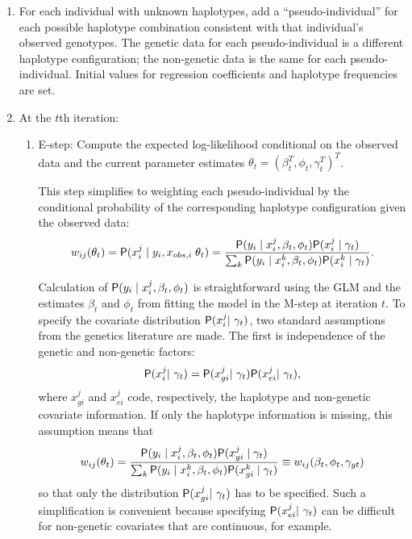 \documentclass[article, shortnames]{jss}
\begin{document}
\begin{enumerate}

\item For each individual with unknown haplotypes, add a ``pseudo-individual'' 
for each possible haplotype combination consistent with that individual's 
observed genotypes. The genetic data for each pseudo-individual is a different 
haplotype configuration; the non-genetic data is the same for each 
pseudo-individual. Initial values for regression coefficients and haplotype 
frequencies are set.

\item At the $t$th iteration:

\begin{enumerate}

\item E-step: Compute the expected log-likelihood conditional on the
observed data and the current parameter estimates
$\theta_t = (\beta_t^T,\phi_t, \gamma_t^T)^T$.

This step simplifies to weighting each pseudo-individual by 
the conditional probability of the corresponding haplotype configuration given 
the observed data:
$$
w_{ij}(\theta_t)  =  
\mathsf{P}(x_i^j \mid y_i,x_{obs,i} \; \theta_t) 
 = 
\frac{\mathsf{P}(y_i\mid x_i^j, \beta_t, \phi_t) \mathsf{P}(x_i^j \mid \gamma_t)}{
\sum_{k}\mathsf{P} (y_i\mid x_i^k, \beta_t, \phi_t) \mathsf{P}(x_i^k \mid \gamma_t)}
. $$

Calculation of $\mathsf{P}(y_i \mid x_i^j , \beta_t, \phi_t)$ is 
straightforward using the GLM and the estimates $\beta_t$ and $\phi_t$
from fitting the model in the M-step at iteration $t$.
To specify the covariate distribution $\mathsf{P} (x_i^{j} |\ \gamma_t)$,
two standard assumptions from the genetics literature
are made. The first is independence of the 
genetic and non-genetic factors:
$$\Prob (x_i^{j} |\ \gamma_t)=\Prob(x_{gi}^{j} |\ \gamma_t) 
\Prob(x_{ei}^{j}|\ \gamma_t),$$ where $x_{gi}^{j}$ 
and $x^j_{ei}$ code, respectively, the haplotype and non-genetic covariate 
information. If only the haplotype information is missing, this assumption 
means that 
$$w_{ij}(\theta_t) 
 = 
\frac{\mathsf{P}(y_i\mid x_i^j, \beta_t, \phi_t) \mathsf{P}(x_{gi}^j \mid \gamma_t)}{
\sum_{k}\mathsf{P} (y_i\mid x_i^k, \beta_t, \phi_t) \mathsf{P}(x_{gi}^k \mid \gamma_t)}
\equiv w_{ij}(\beta_t,\phi_t,\gamma_{gt})  
$$
so that only the distribution $\Prob(x_{gi}^{j} |\ \gamma_t)$
has to be specified.  Such a simplification
is convenient because specifying 
$\mathsf{P}(x_{ei}^{j}|\ \gamma_t)$ can be difficult for non-genetic 
covariates that are continuous, for example.


\end{enumerate}
\end{enumerate}
\end{document}

